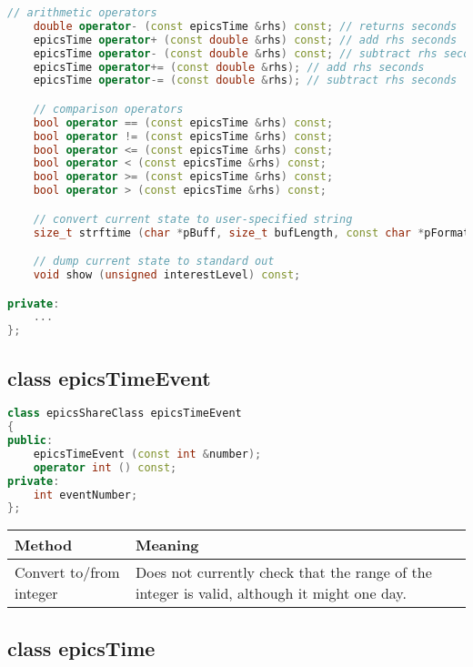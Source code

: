 \begin{lstlisting}[language=C++]
    // arithmetic operators
    double operator- (const epicsTime &rhs) const; // returns seconds
    epicsTime operator+ (const double &rhs) const; // add rhs seconds
    epicsTime operator- (const double &rhs) const; // subtract rhs seconds
    epicsTime operator+= (const double &rhs); // add rhs seconds
    epicsTime operator-= (const double &rhs); // subtract rhs seconds

    // comparison operators
    bool operator == (const epicsTime &rhs) const;
    bool operator != (const epicsTime &rhs) const;
    bool operator <= (const epicsTime &rhs) const;
    bool operator < (const epicsTime &rhs) const;
    bool operator >= (const epicsTime &rhs) const;
    bool operator > (const epicsTime &rhs) const;

    // convert current state to user-specified string
    size_t strftime (char *pBuff, size_t bufLength, const char *pFormat) const;

    // dump current state to standard out
    void show (unsigned interestLevel) const;

private:
    ...
};
\end{lstlisting}

\subsection{class epicsTimeEvent}

\begin{lstlisting}[language=C++]
class epicsShareClass epicsTimeEvent
{
public:
    epicsTimeEvent (const int &number);
    operator int () const;
private:
    int eventNumber;
};
\end{lstlisting}
\begin{center}
\begin{longtable}{p{1.79167in}p{4.94833in}}
\textbf{Method} & \textbf{Meaning}\\
\hline
Convert to/from integer & Does not currently check that the range of the integer is valid, although it might one day.
\end{longtable}

\end{center}


\subsection{class epicsTime}

